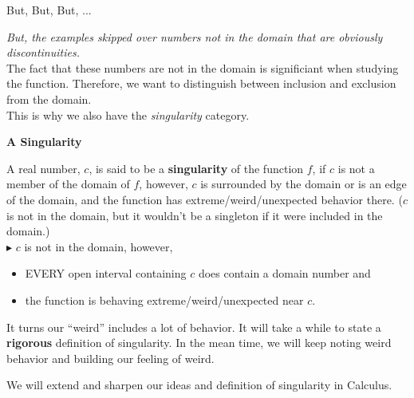 \documentclass{ximera}
\begin{document}
\begin{observation} But, But, But, ...

\textit{But, the examples skipped over numbers not in the domain that are obviously discontinuities.}  \\

The fact that these numbers are not in the domain is significiant when studying the function.  Therefore, we want to distinguish between inclusion and exclusion from the domain. \\

This is why we also have the \textit{singularity} category.
\end{observation}










\begin{idea} \textbf{\textcolor{green!50!black}{A Singularity}}  

A real number, $c$, is said to be a \textbf{singularity} of the function $f$, if $c$ is not a member of the domain of $f$, however, $c$ is surrounded by the domain or is an edge of the domain, and the function has extreme/weird/unexpected behavior there. ($c$ is not in the domain, but it wouldn't be a singleton if it were included in the domain.) \\



$\blacktriangleright$  $c$ is not in the domain, however, 


\begin{itemize}
\item EVERY open interval containing $c$ does contain a domain number and 
\item the function is behaving extreme/weird/unexpected near $c$. \\
\end{itemize}
It turns our ``weird'' includes a lot of behavior.  It will take a while to state a \textbf{\textcolor{purple!85!blue}{rigorous}} definition of singularity.  In the mean time, we will keep noting weird behavior and building our feeling of weird.


We will extend and sharpen our ideas and definition of singularity in Calculus.



\end{idea}
\end{document}
